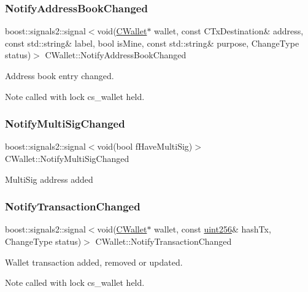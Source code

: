 \subsubsection{\texorpdfstring{NotifyAddressBookChanged}{NotifyAddressBookChanged}}
{\footnotesize\ttfamily boost\+::signals2\+::signal$<$void(\mbox{\hyperlink{class_c_wallet}{C\+Wallet}}$\ast$ wallet, const C\+Tx\+Destination\& address, const std\+::string\& label, bool is\+Mine, const std\+::string\& purpose, Change\+Type status)$>$ C\+Wallet\+::\+Notify\+Address\+Book\+Changed}

Address book entry changed. \begin{DoxyNote}{Note}
called with lock cs\+\_\+wallet held. 
\end{DoxyNote}
\mbox{\label{class_c_wallet_a26c4403efbfe8797d8bd386e6ac2de15}} 
\subsubsection{\texorpdfstring{NotifyMultiSigChanged}{NotifyMultiSigChanged}}
{\footnotesize\ttfamily boost\+::signals2\+::signal$<$void(bool f\+Have\+Multi\+Sig)$>$ C\+Wallet\+::\+Notify\+Multi\+Sig\+Changed}

Multi\+Sig address added \mbox{\label{class_c_wallet_a4cc32526b4e90faadf11a9bd022a956f}} 
\subsubsection{\texorpdfstring{NotifyTransactionChanged}{NotifyTransactionChanged}}
{\footnotesize\ttfamily boost\+::signals2\+::signal$<$void(\mbox{\hyperlink{class_c_wallet}{C\+Wallet}}$\ast$ wallet, const \mbox{\hyperlink{classuint256}{uint256}}\& hash\+Tx, Change\+Type status)$>$ C\+Wallet\+::\+Notify\+Transaction\+Changed}

Wallet transaction added, removed or updated. \begin{DoxyNote}{Note}
called with lock cs\+\_\+wallet held. 
\end{DoxyNote}
\mbox{\label{class_c_wallet_abaeed8c343b4044453a4dd6ac08be906}} 
